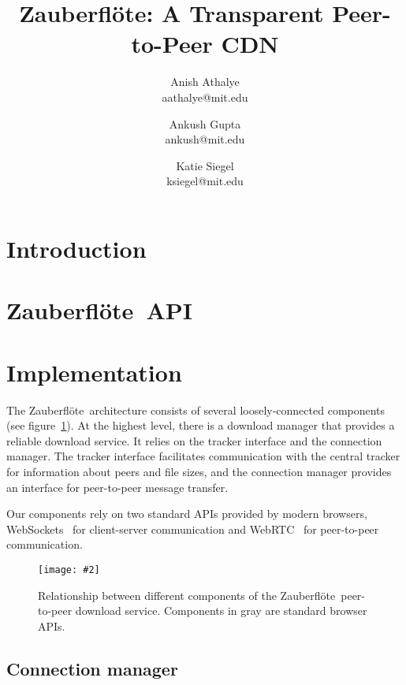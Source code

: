 \documentclass[letterpaper,twocolumn,10pt]{article}
\newcommand{\zbf}{Zauberfl\"{o}te}
\newcommand{\projtitle}{\zbf: A Transparent Peer-to-Peer CDN}
\newcommand{\inclfigure}[3]{
    \begin{figure}
        \begin{centering}
            \texttt{[image: \#2]}
            \caption{#3}
            \label{#1}
        \end{centering}
    \end{figure}
}
\begin{document}
\title{\Large \bf \projtitle}

\author{
    {\rm Anish Athalye}\\
    aathalye@mit.edu
    \and
    {\rm Ankush Gupta}\\
    ankush@mit.edu
    \and
    {\rm Katie Siegel}\\
    ksiegel@mit.edu
}

\maketitle
\thispagestyle{empty}

\begin{abstract}

\end{abstract}

\section{Introduction}


\section{\zbf\ API}


\section{Implementation}

The \zbf\ architecture consists of several loosely-connected components (see
figure~\ref{fig:components}). At the highest level, there is a download manager that
provides a reliable download service. It relies on the tracker interface and
the connection manager. The tracker interface facilitates communication with
the central tracker for information about peers and file sizes, and the
connection manager provides an interface for peer-to-peer message transfer.

Our components rely on two standard APIs provided by modern browsers,
WebSockets~\cite{w3c:websocket} for client-server communication and
WebRTC~\cite{w3c:webrtc} for peer-to-peer communication.

\inclfigure{fig:components}{components.eps}{
    Relationship between different components of the \zbf\ peer-to-peer
    download service. Components in gray are standard browser APIs.
}

\subsection{Connection manager}
\end{document}
